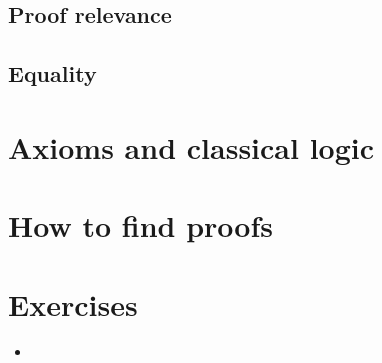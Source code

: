 \documentclass{beamer}
\begin{document}
\subsection{Proof relevance}

\subsection{Equality}



\section{Axioms and classical logic}

\section{How to find proofs}

\section{Exercises}

\begin{frame}{}
\begin{itemize}
	\item 
\end{itemize}
\end{frame}
\end{document}
